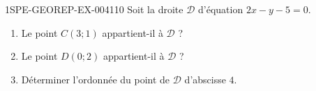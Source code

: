 \begin{exercice}{1SPE-GEOREP-EX-004}{1}{10}
Soit la droite $\mathcal{D}$ d'équation $2x - y - 5 = 0$.
\begin{enumerate}
  \item Le point $C(3 ; 1)$ appartient-il à $\mathcal{D}$ ?
  \item Le point $D(0 ; 2)$ appartient-il à $\mathcal{D}$ ?
  \item Déterminer l'ordonnée du point de $\mathcal{D}$ d'abscisse $4$.
\end{enumerate}
\end{exercice}
